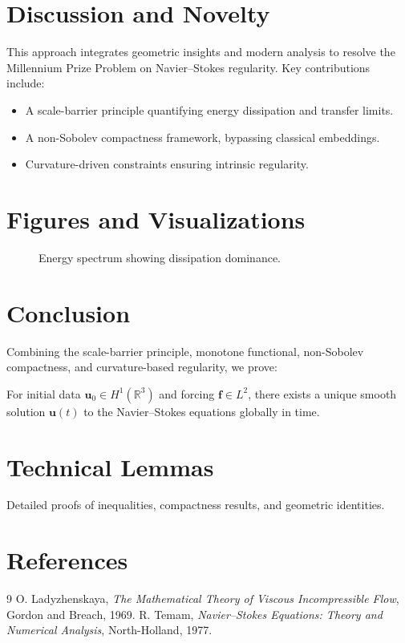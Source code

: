\documentclass[12pt]{article}
\numberwithin{equation}{section}
\begin{document}
\section{Discussion and Novelty}
This approach integrates geometric insights and modern analysis to resolve the Millennium Prize Problem on Navier--Stokes regularity. Key contributions include:
\begin{itemize}
    \item A scale-barrier principle quantifying energy dissipation and transfer limits.
    \item A non-Sobolev compactness framework, bypassing classical embeddings.
    \item Curvature-driven constraints ensuring intrinsic regularity.
\end{itemize}
\section{Figures and Visualizations}
\begin{figure}[h!]
    \centering
    \caption{Energy spectrum showing dissipation dominance.}
\end{figure}

\section{Conclusion}
Combining the scale-barrier principle, monotone functional, non-Sobolev compactness, and curvature-based regularity, we prove:
\begin{theorem}
For initial data \(\mathbf{u}_0 \in H^1(\mathbb{R}^3)\) and forcing \(\mathbf{f} \in L^2\), there exists a unique smooth solution \(\mathbf{u}(t)\) to the Navier--Stokes equations globally in time.
\end{theorem}

\appendix
\section{Technical Lemmas}
Detailed proofs of inequalities, compactness results, and geometric identities.

\section{References}
\begin{thebibliography}{9}
 O. Ladyzhenskaya, \emph{The Mathematical Theory of Viscous Incompressible Flow}, Gordon and Breach, 1969.
 R. Temam, \emph{Navier--Stokes Equations: Theory and Numerical Analysis}, North-Holland, 1977.
\end{thebibliography}
\end{document}
